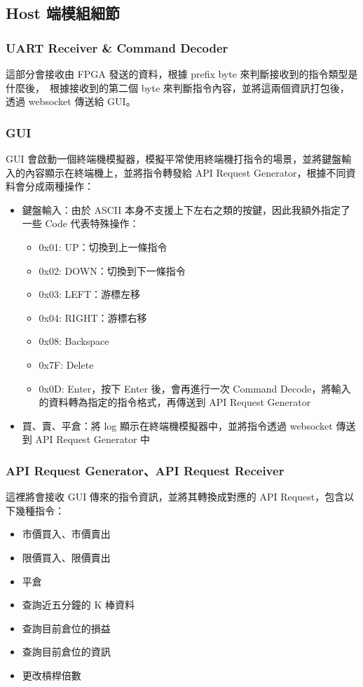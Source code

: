 \documentclass[10.5pt,compsoc,UTF8]{CjC}
\theoremstyle{mystyle}
\begin{document}
\subsection{Host 端模組細節}

\subsubsection*{UART Receiver \& Command Decoder}
這部分會接收由 FPGA 發送的資料，根據 prefix byte 來判斷接收到的指令類型是什麼後，\
根據接收到的第二個 byte 來判斷指令內容，並將這兩個資訊打包後，透過 websocket 傳送給 GUI。

\subsubsection*{GUI}
GUI 會啟動一個終端機模擬器，模擬平常使用終端機打指令的場景，並將鍵盤輸入的內容顯示在終端機上，並將指令轉發給 API Request Generator，根據不同資料會分成兩種操作：
\begin{itemize}
  \item 鍵盤輸入：由於 ASCII 本身不支援上下左右之類的按鍵，因此我額外指定了一些 Code 代表特殊操作：
  \begin{itemize}
    \item 0x01: UP：切換到上一條指令
    \item 0x02: DOWN：切換到下一條指令
    \item 0x03: LEFT：游標左移
    \item 0x04: RIGHT：游標右移
    \item 0x08: Backspace
    \item 0x7F: Delete
    \item 0x0D: Enter，按下 Enter 後，會再進行一次 Command Decode，將輸入的資料轉為指定的指令格式，再傳送到 API Request Generator
  \end{itemize}
  \item 買、賣、平倉：將 log 顯示在終端機模擬器中，並將指令透過 websocket 傳送到 API Request Generator 中
\end{itemize}

\subsubsection*{API Request Generator、API Request Receiver}
這裡將會接收 GUI 傳來的指令資訊，並將其轉換成對應的 API Request，包含以下幾種指令：
\begin{itemize}
  \item 市價買入、市價賣出
  \item 限價買入、限價賣出
  \item 平倉
  \item 查詢近五分鐘的 K 棒資料
  \item 查詢目前倉位的損益
  \item 查詢目前倉位的資訊
  \item 更改槓桿倍數
\end{itemize}
\end{document}
